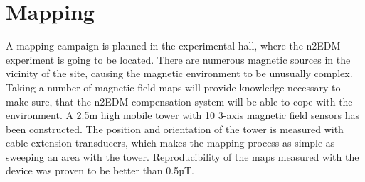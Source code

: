 \chapter{Mapping}
A mapping campaign is planned in the experimental hall, where the n2EDM experiment is going to be located. There are numerous magnetic sources in the vicinity of the site, causing the magnetic environment to be unusually complex. Taking a number of magnetic field maps will provide knowledge necessary to make sure, that the n2EDM compensation system will be able to cope with the environment. A 2.5m high mobile tower with 10 3-axis magnetic field sensors has been constructed. The position and orientation of the tower is measured with cable extension transducers, which makes the mapping process as simple as sweeping an area with the tower. Reproducibility of the maps measured with the device was proven to be better than 0.5µT.
